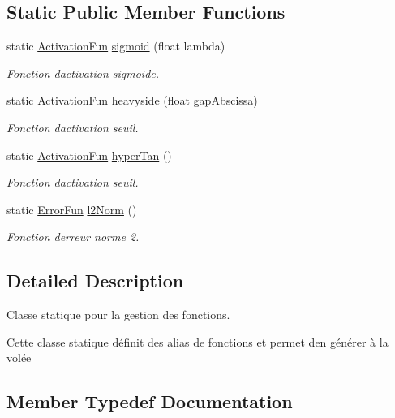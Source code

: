 \subsection*{Static Public Member Functions}
\begin{DoxyCompactItemize}
\item 
static \hyperlink{structFunctions_ad25362ffa52b2f7933431190546593ac}{Activation\+Fun} \hyperlink{structFunctions_a773de9cd59f7ccc3e2fe9822f0536ae4}{sigmoid} (float lambda)
\begin{DoxyCompactList}\small\item\em Fonction d\textquotesingle{}activation sigmoide. \end{DoxyCompactList}\item 
static \hyperlink{structFunctions_ad25362ffa52b2f7933431190546593ac}{Activation\+Fun} \hyperlink{structFunctions_a683c495693f3e2a5ec55e30edaccfd2d}{heavyside} (float gap\+Abscissa)
\begin{DoxyCompactList}\small\item\em Fonction d\textquotesingle{}activation seuil. \end{DoxyCompactList}\item 
static \hyperlink{structFunctions_ad25362ffa52b2f7933431190546593ac}{Activation\+Fun} \hyperlink{structFunctions_a0aac84382fccbc38cacccd566434d4a8}{hyper\+Tan} ()
\begin{DoxyCompactList}\small\item\em Fonction d\textquotesingle{}activation seuil. \end{DoxyCompactList}\item 
static \hyperlink{structFunctions_a834bc4170f1caa8c77272ecf51dbae5c}{Error\+Fun} \hyperlink{structFunctions_a00bac40f42bb6c47d25c0cd238c4275a}{l2\+Norm} ()
\begin{DoxyCompactList}\small\item\em Fonction d\textquotesingle{}erreur norme 2. \end{DoxyCompactList}\end{DoxyCompactItemize}


\subsection{Detailed Description}
Classe statique pour la gestion des fonctions. 

Cette classe statique définit des alias de fonctions et permet d\textquotesingle{}en générer à la volée 

\subsection{Member Typedef Documentation}
\mbox{\label{structFunctions_ad25362ffa52b2f7933431190546593ac}} 
